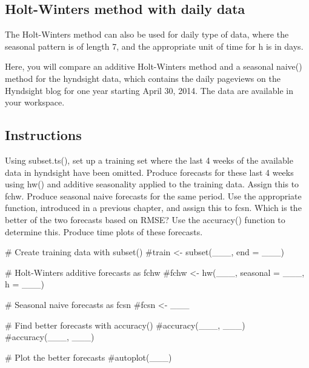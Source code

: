 \documentclass[
  letterpaper,
  DIV=11,
  numbers=noendperiod]{scrartcl}
\newenvironment{Shaded}{\begin{snugshade}}{\end{snugshade}}
\newcommand{\CommentTok}[1]{\textcolor[rgb]{0.37,0.37,0.37}{#1}}
\begin{document}
\hypertarget{holt-winters-method-with-daily-data}{%
\subsection{Holt-Winters method with daily
data}\label{holt-winters-method-with-daily-data}}

The Holt-Winters method can also be used for daily type of data, where
the seasonal pattern is of length 7, and the appropriate unit of time
for h is in days.

Here, you will compare an additive Holt-Winters method and a seasonal
naive() method for the hyndsight data, which contains the daily
pageviews on the Hyndsight blog for one year starting April 30, 2014.
The data are available in your workspace.

\hypertarget{instructions-12}{%
\subsection{Instructions}\label{instructions-12}}

Using subset.ts(), set up a training set where the last 4 weeks of the
available data in hyndsight have been omitted. Produce forecasts for
these last 4 weeks using hw() and additive seasonality applied to the
training data. Assign this to fchw. Produce seasonal naive forecasts for
the same period. Use the appropriate function, introduced in a previous
chapter, and assign this to fcsn. Which is the better of the two
forecasts based on RMSE? Use the accuracy() function to determine this.
Produce time plots of these forecasts.

\begin{Shaded}
\begin{Highlighting}[]
\CommentTok{\# Create training data with subset()}
\CommentTok{\#train \textless{}{-} subset(\_\_\_, end = \_\_\_)}

\CommentTok{\# Holt{-}Winters additive forecasts as fchw}
\CommentTok{\#fchw \textless{}{-} hw(\_\_\_, seasonal = \_\_\_, h = \_\_\_)}

\CommentTok{\# Seasonal naive forecasts as fcsn}
\CommentTok{\#fcsn \textless{}{-} \_\_\_}

\CommentTok{\# Find better forecasts with accuracy()}
\CommentTok{\#accuracy(\_\_\_, \_\_\_)}
\CommentTok{\#accuracy(\_\_\_, \_\_\_)}

\CommentTok{\# Plot the better forecasts}
\CommentTok{\#autoplot(\_\_\_)}
\end{Highlighting}
\end{Shaded}
\end{document}
